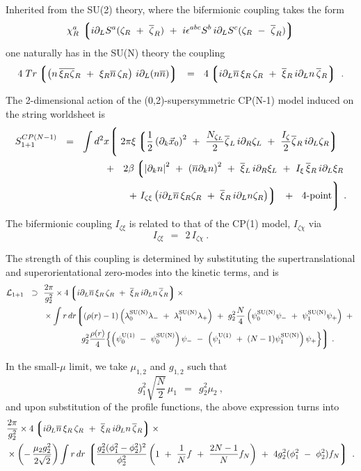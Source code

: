 \documentclass{article}
\newcommand{\p}{\partial}
\newcommand{\ov}{\overline}
\newcommand{\mc}[1]{\mathcal{#1}}
\newcommand{\lgr}{\left\lgroup}
\newcommand{\rgr}{\right\rgroup}
\begin{document}
Inherited from the SU(2) theory, where the bifermionic coupling takes the form
\[
	\chi_R^a \, \lgr  i \p_L S^a (\zeta_R ~+~ \ov{\zeta}_R) ~+~
				i\epsilon^{abc}S^b\, i \p_L S^c (\zeta_R ~-~ \ov{\zeta}_R ) \rgr
\]
one naturally has in the SU(N) theory the coupling 
\[
	4\; Tr \lgr  \left( n\,\ov{\xi_R \zeta}{}_R ~+~ \xi_R \ov{n}\, \zeta_R \right) \, i \p_L (n\ov{n}) \rgr  ~~=~~
	4 \lgr  i\p_L \ov{n}\, \xi_R \, \zeta_R  ~+~  \ov{\xi}{}_R \, i \p_L n\, \ov{\zeta}{}_R \rgr~.
\]

The 2-dimensional action of the (0,2)-supersymmetric CP(N-1) model induced on the string worldsheet is
\begin{align}
%
\notag
	S_{\rm 1+1}^{CP(N-1)} ~~=~~  \int d^2x 
	\Biggl\lgroup\; 
	&
		2\pi\xi \lgr   \frac{1}{2} \left(\p_k \vec{x}_0 \right)^2
				~+~  \frac{N_{\zeta_L}}{2} \ov{\zeta}{}_L\, i\p_R \zeta_L 
				~+~  \frac{I_\zeta}{2} \ov{\zeta}{}_R\, i\p_L \zeta_R
			\rgr
	\\
%
\label{world_unnorm}
	~~+~~  
	&\;
	2\beta \lgr \left|\p_k n \right|^2  ~+~ \left(\ov{n}\p_k n\right)^2  
		~+~ \ov{\xi}{}_L\, i\p_R \xi_L  ~+~  I_\xi\, \ov{\xi}{}_R\, i\p_L  \xi_R
		\right .
	\\
%
\notag
	&\;
		\left. 
		~+~ I_{\zeta\xi} 
			\left(  i\p_L\ov{n}\, \xi_R \zeta_R ~+~  \ov{\xi}{}_R \, i\p_L n \zeta_R \right)
	 \rgr
	~~+~~  \text{4-point}
	\Biggr\rgroup ~.
\end{align}
	The bifermionic coupling $ I_{\zeta\xi} $ is related to that of the CP(1) model, $ I_{\zeta\chi} $ via
\[
	I_{\zeta\xi} ~~=~~ 2\, I_{\zeta\chi}~.
\]

The strength of this coupling is determined by substituting the supertranslational and superorientational zero-modes
into the kinetic terms, and is
\begin{align}
%
\notag
	\mc{L}_{\rm 1+1} ~~\supset~~
	&
	\frac{2\pi}{g_2^2} \times  
	4 \lgr  i\p_L \ov{n}\, \xi_R \, \zeta_R  ~+~  \ov{\xi}{}_R \, i \p_L n\, \ov{\zeta}{}_R \rgr
	\times
	\\
%
\label{biferm_general}
	&
	\times
	\int r\, dr 
	\biggl\lgroup  ( \rho(r)-1 ) \left( \loN \lambda_-   ~+~   \llN \lambda_+ \right) ~+~
	g_2^2 \frac{N}{4} \left( \poN \psi_-   ~+~   \plN \psi_+ \right)  ~+~
	\\
%
\notag
	&
	\qquad\qquad~~
	g_2^2 \frac{\rho(r)}{4} \Bigl\{ \left(\poU ~-~ \poN\right) \psi_- ~-~
	     		         	\left(\plU ~+~ (N-1)\plN\right) \psi_+ \Bigr\} 
	\biggr\rgroup~.
\end{align}

In the small-$\mu$ limit, we take $ \mu_{1,2} $ and $ g_{1,2} $ such that
\[
	g_1^2 \sqrt{\frac{N}{2}}\, \mu_1 ~~=~~ g_2^2 \mu_2~,
\]
and upon substitution of the profile functions, the above expression turns into
\begin{align*}
%
	&
	\frac{2\pi}{g_2^2} \times  
	4 \lgr  i\p_L \ov{n}\, \xi_R \, \zeta_R  ~+~  \ov{\xi}{}_R \, i \p_L n\, \ov{\zeta}{}_R \rgr
	\times
	\\
%
	&
	\times
	\left( -\, \frac{\mu_2 g_2^2}{2\sqrt{2}} \right)
	\int r\, dr \,
	\lgr  \frac{g_2^2(\phi_1^2 - \phi_2^2)^2}{\phi_2^2} 
			\left( 1 ~+~ \frac{1}{N} f ~+~ \frac{2N - 1}{N}f_N \right) 
			~+~
		4 g_2^2 (\phi_1^2 ~-~ \phi_2^2) f_N \rgr~.
\end{align*}
\end{document}

